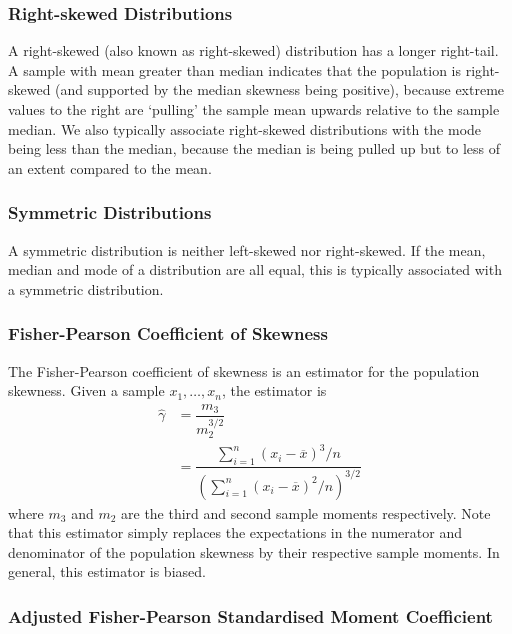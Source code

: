 \documentclass[11pt]{report} %
\begin{document}
\subsubsection{Right-skewed Distributions}

A right-skewed (also known as right-skewed) distribution has a longer right-tail. A sample with mean greater than median indicates that the population is right-skewed (and supported by the median skewness being positive), because extreme values to the right are `pulling' the sample mean upwards relative to the sample median. We also typically associate right-skewed distributions with the mode being less than the median, because the median is being pulled up but to less of an extent compared to the mean.

\subsubsection{Symmetric Distributions}

A symmetric distribution is neither left-skewed nor right-skewed. If the mean, median and mode of a distribution are all equal, this is typically associated with a symmetric distribution.

\subsubsection{Fisher-Pearson Coefficient of Skewness}

The Fisher-Pearson coefficient of skewness is an estimator for the population skewness. Given a sample $x_{1}, \dots, x_{n}$, the estimator is
\begin{align}
\hat{\gamma} &= \dfrac{m_{3}}{m_{2}^{3/2}} \\
&= \dfrac{\sum_{i = 1}^{n}\left(x_{i} - \overline{x}\right)^{3}/n}{\left(\sum_{i = 1}^{n}\left(x_{i} - \overline{x}\right)^{2}/n\right)^{3/2}}
\end{align}
where $m_{3}$ and $m_{2}$ are the third and second sample moments respectively. Note that this estimator simply replaces the expectations in the numerator and denominator of the population skewness by their respective sample moments. In general, this estimator is biased.

\subsubsection{Adjusted Fisher-Pearson Standardised Moment Coefficient}
\end{document}
